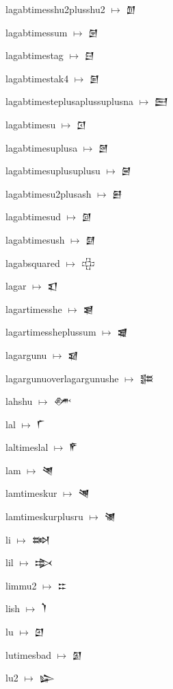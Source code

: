 {\noindent lagabtimesshu2plusshu2 $\mapsto$ {\cufont 𒇠}\par
\noindent lagabtimessum $\mapsto$ {\cufont 𒇡}\par
\noindent lagabtimestag $\mapsto$ {\cufont 𒇢}\par
\noindent lagabtimestak4 $\mapsto$ {\cufont 𒇣}\par
\noindent lagabtimesteplusaplussuplusna $\mapsto$ {\cufont 𒇤}\par
\noindent lagabtimesu $\mapsto$ {\cufont 𒇥}\par
\noindent lagabtimesuplusa $\mapsto$ {\cufont 𒇦}\par
\noindent lagabtimesuplusuplusu $\mapsto$ {\cufont 𒇧}\par
\noindent lagabtimesu2plusash $\mapsto$ {\cufont 𒇨}\par
\noindent lagabtimesud $\mapsto$ {\cufont 𒇩}\par
\noindent lagabtimesush $\mapsto$ {\cufont 𒇪}\par
\noindent lagabsquared $\mapsto$ {\cufont 𒇫}\par
\noindent lagar $\mapsto$ {\cufont 𒇬}\par
\noindent lagartimesshe $\mapsto$ {\cufont 𒇭}\par
\noindent lagartimessheplussum $\mapsto$ {\cufont 𒇮}\par
\noindent lagargunu $\mapsto$ {\cufont 𒇯}\par
\noindent lagargunuoverlagargunushe $\mapsto$ {\cufont 𒇰}\par
\noindent lahshu $\mapsto$ {\cufont 𒇱}\par
\noindent lal $\mapsto$ {\cufont 𒇲}\par
\noindent laltimeslal $\mapsto$ {\cufont 𒇳}\par
\noindent lam $\mapsto$ {\cufont 𒇴}\par
\noindent lamtimeskur $\mapsto$ {\cufont 𒇵}\par
\noindent lamtimeskurplusru $\mapsto$ {\cufont 𒇶}\par
\noindent li $\mapsto$ {\cufont 𒇷}\par
\noindent lil $\mapsto$ {\cufont 𒇸}\par
\noindent limmu2 $\mapsto$ {\cufont 𒇹}\par
\noindent lish $\mapsto$ {\cufont 𒇺}\par
\noindent lu $\mapsto$ {\cufont 𒇻}\par
\noindent lutimesbad $\mapsto$ {\cufont 𒇼}\par
\noindent lu2 $\mapsto$ {\cufont 𒇽}\par
}
